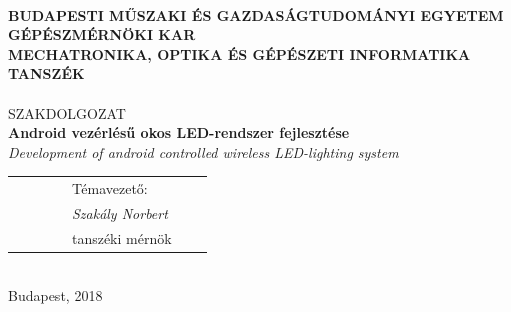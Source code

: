 \documentclass[12pt,a4paper]{article}
\begin{document}
\thispagestyle{empty}
\begin{titlepage} %
\centering
{}\\[1ex]
{\bf BUDAPESTI MŰSZAKI ÉS GAZDASÁGTUDOMÁNYI EGYETEM}\\
{\bf GÉPÉSZMÉRNÖKI KAR}\\
{\bf MECHATRONIKA, OPTIKA ÉS GÉPÉSZETI INFORMATIKA TANSZÉK}\\[3cm]

{\LARGE \scshape \myname}\\[2ex]
{\LARGE SZAKDOLGOZAT}\\[2ex]
{\LARGE \bf Android vezérlésű okos LED-rendszer fejlesztése}\\[2ex]
{\itshape Development of android controlled wireless LED-lighting system}\\[5cm]

\begin{tabularx}{\textwidth}{XXXX}
~~~~~~ & Témavezető: \\
\hspace{0.75cm} \itshape ~~~~~~ & \hspace{0.75cm} \itshape Szakály Norbert \\
\hspace{0.75cm} ~~~~~~ & \hspace{0.75cm} tanszéki mérnök \\
\end{tabularx}\\[5.5cm]

{\Large Budapest, 2018}
\end{titlepage}
\newpage

\setcounter{page}{4}
% 
\newpage

\newpage\pagestyle{plain}
\tableofcontents
\newpage
\end{document}
